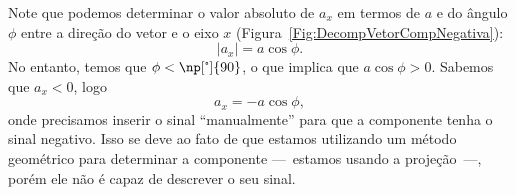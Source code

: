 %   

%        
%    
%    



Note que podemos determinar o valor absoluto de $a_x$ em termos de $a$ e do ângulo $\phi$ entre a direção do vetor e o eixo $x$ (Figura~\ref{Fig:DecompVetorCompNegativa}):
\begin{equation}
    |a_x| = a \cos\phi.
\end{equation}
No entanto, temos que $\phi < \np[\tcdegree]{90}$, o que implica que $a \cos\phi > 0$. Sabemos que $a_x < 0$, logo
\begin{equation}
    a_x = - a \cos\phi,
\end{equation}
%
onde precisamos inserir o sinal ``manualmente'' para que a componente tenha o sinal negativo. Isso se deve ao fato de que estamos utilizando um método geométrico para determinar a componente ---~estamos usando a projeção~---, porém ele não é capaz de descrever o seu sinal.

